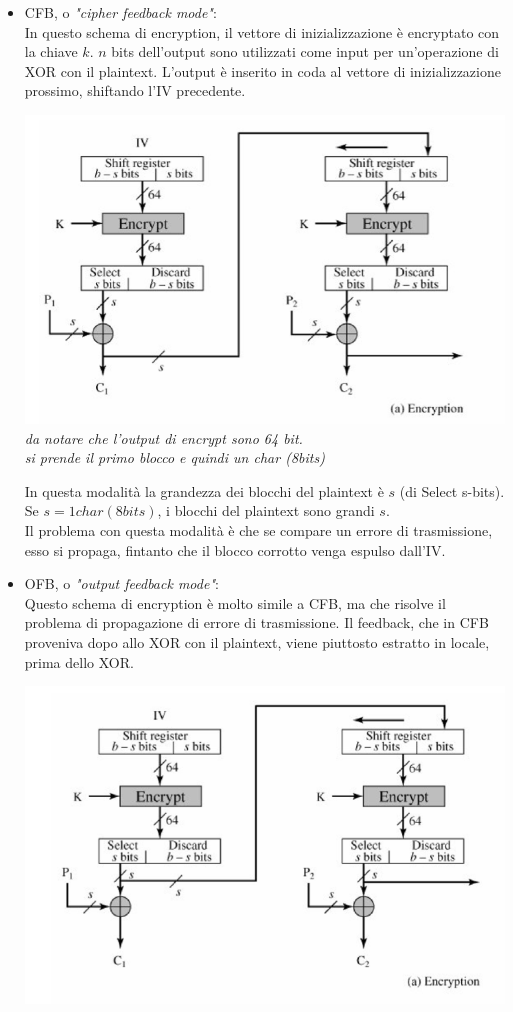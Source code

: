 \documentclass[11pt, oneside]{article}   	%
\begin{document}
\begin{itemize}
\item CFB, o \emph{"cipher feedback mode"}:\\
In questo schema di encryption, il vettore di inizializzazione è encryptato con la chiave $k$. $n$ bits dell'output sono utilizzati come input per un'operazione di XOR con il plaintext. L'output è inserito in coda al vettore di inizializzazione prossimo, shiftando l'IV precedente.
\begin{center}
\includegraphics[scale= 0.7]{cfb}\\
\emph{da notare che l'output di encrypt sono 64 bit. \\si prende il primo blocco e quindi un char (8bits)}
\end{center}
In questa modalità la grandezza dei blocchi del plaintext è $s$ (di Select s-bits). \\Se $s = 1 char (8 bits)$, i blocchi del plaintext sono grandi $s$. \\
Il problema con questa modalità è che se compare un errore di trasmissione, esso si propaga, fintanto che il blocco corrotto venga espulso dall'IV.
\item OFB, o \emph{"output feedback mode"}:\\
Questo schema di encryption è molto simile a CFB, ma che risolve il problema di propagazione di errore di trasmissione. Il feedback, che in CFB proveniva dopo allo XOR con il plaintext, viene piuttosto estratto in locale, prima dello XOR.
\begin{center}
\includegraphics[scale= 0.7]{ofb}\\

\end{center}
\end{itemize}
\end{document}
